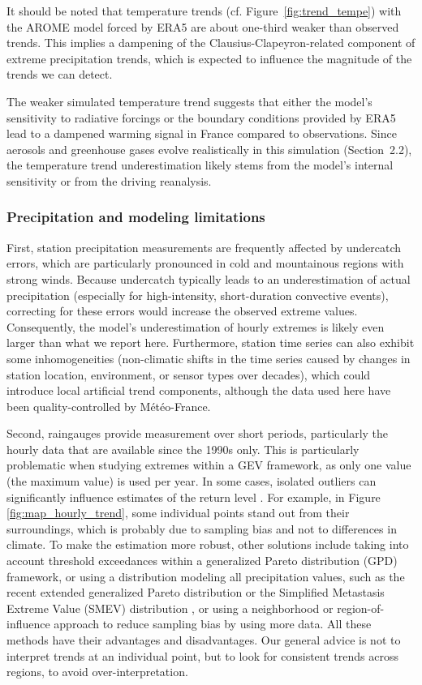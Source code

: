 \documentclass[hess, manuscript]{copernicus}
\begin{document}
It should be noted that temperature trends (cf. Figure~\ref{fig:trend_tempe}) with the AROME model forced by ERA5 are about one-third weaker than observed trends. This implies a dampening of the Clausius-Clapeyron-related component of extreme precipitation trends, which is expected to influence the magnitude of the trends we can detect.

The weaker simulated temperature trend suggests that either the model's sensitivity to radiative forcings or the boundary conditions provided by ERA5 lead to a dampened warming signal in France compared to observations. Since aerosols and greenhouse gases evolve realistically in this simulation (Section~2.2), the temperature trend underestimation likely stems from the model's internal sensitivity or from the driving reanalysis.

\subsubsection{Precipitation and modeling limitations}\label{precipitation-limitations}

First, station precipitation measurements are frequently affected by undercatch errors, which are particularly pronounced in cold and mountainous regions with strong winds. Because undercatch typically leads to an underestimation of actual precipitation (especially for high-intensity, short-duration convective events), correcting for these errors would increase the observed extreme values. Consequently, the model's underestimation of hourly extremes is likely even larger than what we report here. Furthermore, station time series can also exhibit some inhomogeneities (non-climatic shifts in the time series caused by changes in station location, environment, or sensor types over decades), which could introduce local artificial trend components, although the data used here have been quality-controlled by Météo-France.

Second, raingauges provide measurement over short periods, particularly the hourly data that are available since the 1990s only. This is particularly problematic when studying extremes within a GEV framework, as only one value (the maximum value) is used per year. In some cases, isolated outliers can significantly influence estimates of the return level \citep{Zeder2024}. 
For example, in Figure \ref{fig:map_hourly_trend}, some individual points stand out from their surroundings, which is probably due to sampling bias and not to differences in climate. To make the estimation more robust, other solutions include taking into account threshold exceedances within a generalized Pareto distribution (GPD) framework, or using a distribution modeling all precipitation values, such as the recent extended generalized Pareto distribution \citep{haruna-etal-2025} or the Simplified Metastasis Extreme Value (SMEV) distribution \citep{marra2020, correa2025, lompi2025}, or using a neighborhood or region-of-influence approach \citep{blanchet2021explaining} to reduce sampling bias by using more data.
All these methods have their advantages and disadvantages. Our general advice is not to interpret trends at an individual point, but to look for consistent trends across regions, to avoid over-interpretation.
\end{document}
